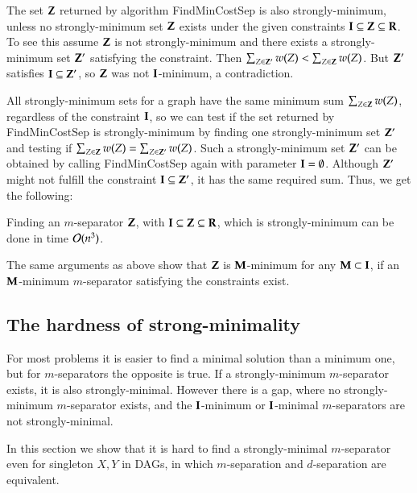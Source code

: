 %

%

The set $ {\bf Z} $ returned by algorithm  {\sc FindMinCostSep} is also strongly-minimum, 
unless no strongly-minimum set ${\bf Z}$ exists under the given constraints $ {\bf I}\subseteq {\bf Z}\subseteq {\bf R} $. 
To see this assume $ {\bf Z} $ is not strongly-minimum and there exists a 
strongly-minimum set $ {\bf Z}' $ satisfying the constraint. Then $ \sum_{Z\in{\bf Z}'} w(Z) < \sum_{Z\in{\bf Z}} w(Z) $. But $ {\bf Z}' $ satisfies $ {\bf I} \subseteq {\bf Z}' $, so  $ {\bf Z} $ was not $ {\bf I} $-minimum, a contradiction.

All strongly-minimum sets for a graph have the same minimum sum $ \sum_{Z\in{\bf Z}} w(Z) $, 
regardless of the constraint $ {\bf I} $, 
so we can test if the set returned by {\sc FindMinCostSep} is 
strongly-minimum by finding one strongly-minimum set $ {\bf Z}' $ and 
testing if $ \sum_{Z\in{\bf Z}} w(Z) = \sum_{Z\in{\bf Z}'} w(Z) $.  
Such a strongly-minimum set $ {\bf Z}' $ can be obtained by 
calling {\sc FindMinCostSep} again with parameter $ {\bf I} = \emptyset $. 
Although $ {\bf Z}' $ might not fulfill the constraint $ {\bf I} \subseteq{\bf Z}' $, it has the same required sum.
Thus, we get the following:
%

\begin{proposition}\label{prop:FindMinCostSep:proper}
Finding an $m$-separator ${\bf Z}$, with ${\bf I}\subseteq{\bf Z}\subseteq{\bf R}$, which is strongly-minimum
can be done in time ${\cal O}(n^3)$.
\end{proposition}

The same arguments as above show that $ {\bf Z} $ is $ {\bf M} $-minimum for any $ {\bf M} \subset {\bf I} $, 
if an $ {\bf M} $-minimum $ m $-separator satisfying the constraints exist.

%
%
%
%
%
%
%
%
%
%
%
%
%
%
%




\subsection{The hardness of strong-minimality}

For most problems it is easier to find a minimal solution than 
a minimum one, but for $m$-separators the opposite is true. 
If a strongly-minimum $m$-separator exists, it is also strongly-minimal. 
However there is a gap, where no strongly-minimum $m$-separator exists,
and the ${\bf I}$-minimum or $ {\bf I} $-minimal $m$-separators are not strongly-minimal.


In this section we show that it is hard to find a strongly-minimal $ m $-separator even for singleton $X, Y$ in DAGs, in which  $ m $-separation and $ d $-separation are equivalent. 


